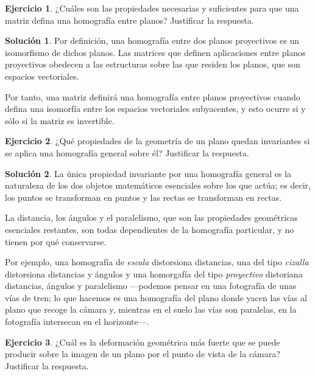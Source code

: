 \documentclass[a4paper, 11pt]{article}
\theoremstyle{definition}
\newtheorem{ejercicio}{Ejercicio}
\newtheorem*{solucion}{Solución}
\theoremstyle{theorem}
\begin{document}
  \begin{ejercicio}
      ¿Cuáles son las propiedades necesarias y suficientes para que una matriz defina una homografía entre planos? Justificar la respuesta.
  \end{ejercicio}

  \begin{solucion}
      Por definición, una homografía entre dos planos proyectivos es un isomorfismo de dichos planos. Las matrices que definen aplicaciones entre planos proyectivos obedecen a las estructuras sobre las que residen los planos, que son espacios vectoriales.

      Por tanto, una matriz definirá una homografía entre planos proyectivos cuando defina una isomorfía entre los espacios vectoriales subyacentes, y esto ocurre si y sólo si la matriz es invertible.
  \end{solucion}

  \begin{ejercicio}
      ¿Qué propiedades de la geometría de un plano quedan invariantes si se aplica una homografía general sobre él? Justificar la respuesta.
  \end{ejercicio}

  \begin{solucion}
      La única propiedad invariante por una homografía general es la naturaleza de los dos objetos matemáticos esenciales sobre los que actúa; es decir, los puntos se transforman en puntos y las rectas se transforman en rectas.

      La distancia, los ángulos y el paralelismo, que son las propiedades geométricas esenciales restantes, son todas dependientes de la homografía particular, y no tienen por qué conservarse.

      Por ejemplo, una homografía de \emph{escala} distorsiona distancias, una del tipo \emph{cizalla} distorsiona distancias y ángulos y una homorgafía del tipo \emph{proyectivo} distoriana distancias, ángulos y paralelismo ---podemos pensar en una fotografía de unas vías de tren; lo que hacemos es una homografía del plano donde yacen las vías al plano que recoge la cámara y, mientras en el suelo las vías son paralelas, en la fotografía intersecan en el horizonte---.
  \end{solucion}

  \begin{ejercicio}
      ¿Cuál es la deformación geométrica más fuerte que se puede producir sobre la imagen de un plano por el punto de vista de la cámara? Justificar la respuesta.
  \end{ejercicio}
\end{document}
